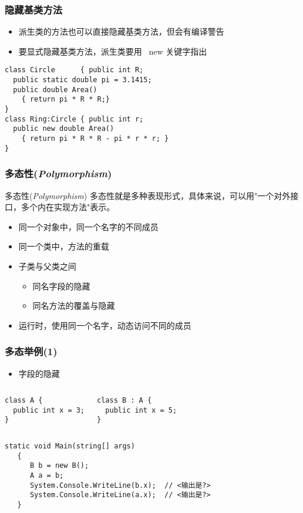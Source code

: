 \begin{frame}[fragile]
\frametitle{隐藏基类方法}
\begin{itemize}
\item 派生类的方法也可以直接隐藏基类方法，但会有编译警告
\item 要显式隐藏基类方法，派生类要用 ~new 关键字指出
\end{itemize}
\begin{lstlisting}
class Circle      { public int R;
  public static double pi = 3.1415;
  public double Area()
    { return pi * R * R;}
}
class Ring:Circle { public int r;
  public new double Area()
    { return pi * R * R - pi * r * r; }
}
\end{lstlisting}

\end{frame}

\begin{frame}
\frametitle{多态性(\textit{Polymorphism})}

\begin{block}{多态性(\textit{Polymorphism})}
  \CJKindent 多态性就是多种表现形式，具体来说，可以用"一个对外接口，多个内在实现方法"表示。
\end{block}

  \begin{itemize}
    \setlength{\itemsep}{8pt plus 1pt}
  \item 同一个对象中，同一个名字的不同成员
  \item 同一个类中，方法的重载
  \item 子类与父类之间
    \begin{itemize}
    \item 同名字段的隐藏
    \item 同名方法的覆盖与隐藏
    \end{itemize}
  \item 运行时，使用同一个名字，动态访问不同的成员
  \end{itemize}
\end{frame}

\begin{frame}[fragile]
\frametitle{多态举例(1)}
\begin{itemize}
\item 字段的隐藏
\end{itemize}
\begin{columns}
\begin{lstlisting}
class A {
  public int x = 3;
}
\end{lstlisting}
\begin{lstlisting}
class B : A {
  public int x = 5;
}
\end{lstlisting}
\end{columns}
\begin{lstlisting}[escapeinside=<>]
   static void Main(string[] args)
   {
      B b = new B();
      A a = b;
      System.Console.WriteLine(b.x);  // <输出是?>
      System.Console.WriteLine(a.x);  // <输出是?>
   }
\end{lstlisting}
\end{frame}

